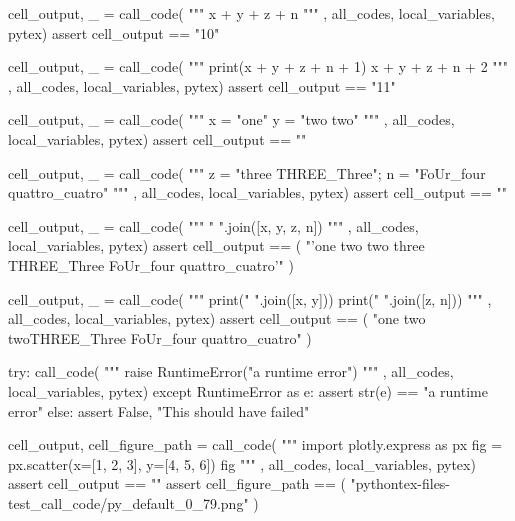 \documentclass{book}
\begin{document}
\begin{pycell}
cell_output, _ = call_code(
"""
x + y + z + n
"""
,
all_codes, local_variables, pytex)
assert cell_output == "10"
\end{pycell}

\begin{pycell}
cell_output, _ = call_code(
"""
print(x + y + z + n + 1)
x + y + z + n + 2
"""
,
all_codes, local_variables, pytex)
assert cell_output == "11"
\end{pycell}

\begin{pycell}
cell_output, _ = call_code(
"""
x = "one"
y = "two two"
"""
,
all_codes, local_variables, pytex)
assert cell_output == ""
\end{pycell}

\begin{pycell}
cell_output, _ = call_code(
"""
z = "three THREE_Three"; n = "FoUr_four quattro_cuatro"
"""
,
all_codes, local_variables, pytex)
assert cell_output == ""
\end{pycell}

\begin{pycell}
cell_output, _ = call_code(
"""
" ".join([x, y, z, n])
"""
,
all_codes, local_variables, pytex)
assert cell_output == (
    "'one two two three THREE_Three FoUr_four quattro_cuatro'"
)
\end{pycell}

\begin{pycell}
cell_output, _ = call_code(
"""
print(" ".join([x, y]))
print(" ".join([z, n]))
"""
,
all_codes, local_variables, pytex)
assert cell_output == (
    "one two two\nthree THREE_Three FoUr_four quattro_cuatro"
)
\end{pycell}

\begin{pycell}
try:
    call_code(
"""
raise RuntimeError("a runtime error")
"""
,
all_codes, local_variables, pytex)
except RuntimeError as e:
    assert str(e) == "a runtime error"
else:
    assert False, "This should have failed"
\end{pycell}

\begin{pycell}
cell_output, cell_figure_path = call_code(
"""
import plotly.express as px
fig = px.scatter(x=[1, 2, 3], y=[4, 5, 6])
fig
"""
,
all_codes, local_variables, pytex)
assert cell_output == ""
assert cell_figure_path == (
    "pythontex-files-test_call_code/py_default_0_79.png"
)
\end{pycell}
\end{document}
